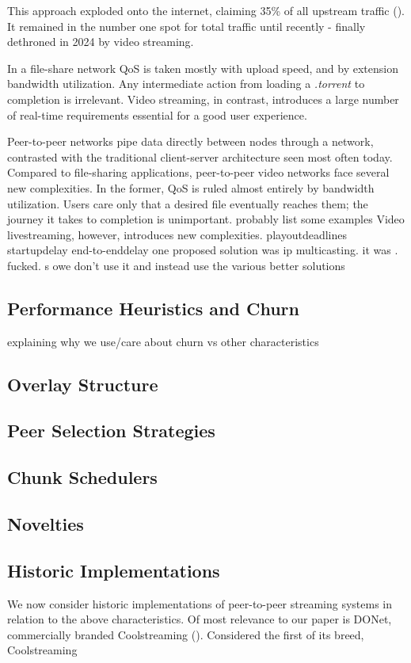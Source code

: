 \documentclass[12pt,a4paper]{article}
\begin{document}
This approach exploded onto the internet, claiming 35\% of all upstream traffic (\cite{archiveCacheLogicResearch}). It remained in the number one spot for total traffic until recently - finally dethroned in 2024 by video streaming. 

In a file-share network QoS is taken mostly with upload speed, and by extension bandwidth utilization. Any intermediate action from loading a \textit{.torrent} to completion is irrelevant. Video streaming, in contrast, introduces a large number of real-time requirements essential for a good user experience.



Peer-to-peer networks pipe data directly between nodes through a network, contrasted with the traditional client-server architecture seen most often today.  Compared to file-sharing applications, peer-to-peer video networks face several new complexities. In the former, QoS is ruled almost entirely by bandwidth utilization. Users care only that a desired file eventually reaches them; the journey it takes to completion is unimportant.  probably list some examples Video livestreaming, however, introduces new complexities. playoutdeadlines startupdelay end-to-enddelay
one proposed solution was ip multicasting. it was . fucked. s owe don't use it and instead use the various better solutions
\subsection{Performance Heuristics and Churn}
explaining why we use/care about churn vs other characteristics
\subsection{Overlay Structure}
\subsection{Peer Selection Strategies}
\subsection{Chunk Schedulers}
\subsection{Novelties}
\subsection{Historic Implementations}
We now consider historic implementations of peer-to-peer streaming systems in relation to the above characteristics. Of most relevance to our paper is DONet, commercially branded Coolstreaming (\cite{1498486}). Considered the first of its breed, Coolstreaming \cite{Xie2007} \cite{asdasd} \cite{1498486}
\end{document}
